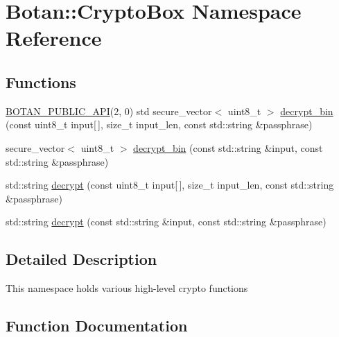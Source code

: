\hypertarget{namespace_botan_1_1_crypto_box}{}\section{Botan\+:\+:Crypto\+Box Namespace Reference}
\label{namespace_botan_1_1_crypto_box}
\subsection*{Functions}
\begin{DoxyCompactItemize}
\item 
\hyperlink{namespace_botan_a6b9388030d872e586a4655b776ac9501}{B\+O\+T\+A\+N\+\_\+\+P\+U\+B\+L\+I\+C\+\_\+\+A\+PI}(2, 0) std secure\+\_\+vector$<$ uint8\+\_\+t $>$ \hyperlink{namespace_botan_1_1_crypto_box_a199e24d44059bb575cd5e741d651ab79}{decrypt\+\_\+bin} (const uint8\+\_\+t input\mbox{[}$\,$\mbox{]}, size\+\_\+t input\+\_\+len, const std\+::string \&passphrase)
\item 
secure\+\_\+vector$<$ uint8\+\_\+t $>$ \hyperlink{namespace_botan_1_1_crypto_box_a19455a8f07e7112fe8ea625a3d83e9a0}{decrypt\+\_\+bin} (const std\+::string \&input, const std\+::string \&passphrase)
\item 
std\+::string \hyperlink{namespace_botan_1_1_crypto_box_a14578f49188fcb22c26b00cf6fecfecd}{decrypt} (const uint8\+\_\+t input\mbox{[}$\,$\mbox{]}, size\+\_\+t input\+\_\+len, const std\+::string \&passphrase)
\item 
std\+::string \hyperlink{namespace_botan_1_1_crypto_box_aaa596df95c0bed67d30840dbc0ca2142}{decrypt} (const std\+::string \&input, const std\+::string \&passphrase)
\end{DoxyCompactItemize}


\subsection{Detailed Description}
This namespace holds various high-\/level crypto functions 

\subsection{Function Documentation}
\mbox{\label{namespace_botan_1_1_crypto_box_a14578f49188fcb22c26b00cf6fecfecd}} 
